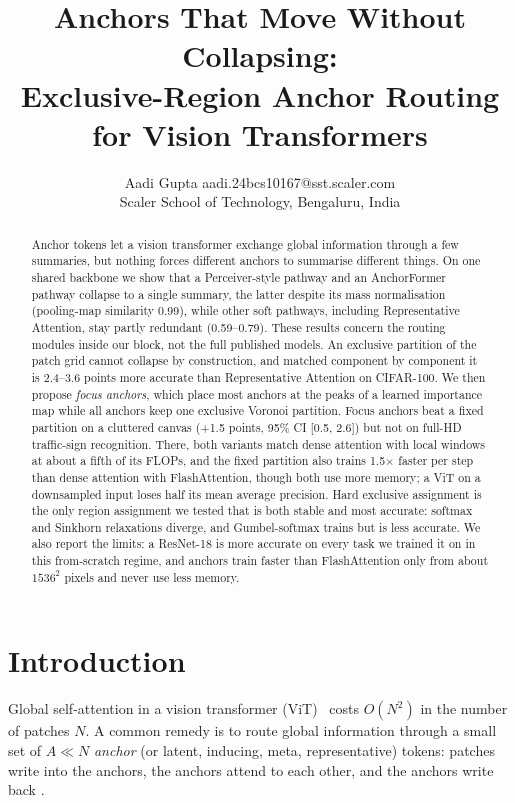 \documentclass[10pt]{article}
\title{Anchors That Move Without Collapsing:\\Exclusive-Region Anchor Routing for Vision Transformers}
\author{\name Aadi Gupta \email aadi.24bcs10167@sst.scaler.com \\
      \addr Scaler School of Technology, Bengaluru, India}
\begin{document}
\maketitle

\begin{abstract}
Anchor tokens let a vision transformer exchange global information through a few summaries, but
nothing forces different anchors to summarise different things. On one shared backbone we show
that a Perceiver-style pathway and an AnchorFormer pathway collapse to a single summary, the
latter despite its mass normalisation (pooling-map similarity 0.99), while other soft pathways,
including Representative Attention, stay partly redundant (0.59--0.79). These results concern the
routing modules inside our block, not the full published models. An
exclusive partition of the patch grid cannot collapse by construction, and matched component by
component it is 2.4--3.6 points more accurate than Representative Attention on CIFAR-100. We
then propose \emph{focus anchors}, which place most anchors at the peaks of a learned importance
map while all anchors keep one exclusive Voronoi partition. Focus anchors beat a fixed partition
on a cluttered canvas (+1.5 points, 95\% CI [0.5, 2.6]) but not on full-HD traffic-sign
recognition. There, both variants match dense attention with local windows at about a fifth of
its FLOPs, and the fixed partition also trains 1.5$\times$ faster per step than dense attention
with FlashAttention, though both use more memory; a ViT on a downsampled input loses half its
mean average precision. Hard
exclusive assignment is the only region assignment we tested that is both stable and most
accurate: softmax and Sinkhorn relaxations diverge, and Gumbel-softmax trains but is less
accurate. We also report the limits: a ResNet-18 is more accurate on every task we trained it on
in this from-scratch regime, and
anchors train faster than FlashAttention only from about $1536^2$ pixels and never use less
memory.
\end{abstract}

\section{Introduction}

Global self-attention in a vision transformer (ViT)~\citep{dosovitskiy2021vit} costs $O(N^2)$ in
the number of patches $N$. A common remedy is to route global information through a small set of
$A\ll N$ \emph{anchor} (or latent, inducing, meta, representative) tokens: patches write into the
anchors, the anchors attend to each other, and the anchors write back
\citep{lee2019settransformer,jaegle2021perceiver,grainger2023paca,jiang2024lemevit,anchorformer2025,representative2026}.
\end{document}

